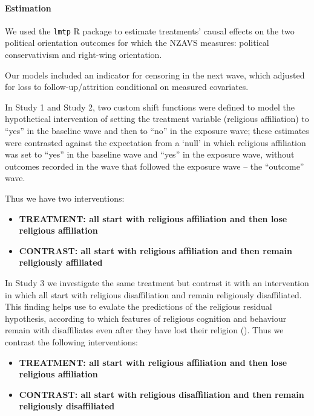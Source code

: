 \documentclass[
  singlecolumn]{article}
\let\oldparagraph\paragraph
\renewcommand{\paragraph}[1]{\oldparagraph{#1}\mbox{}}
\begin{document}
\paragraph{Estimation}\label{estimation}

We used the \texttt{lmtp} R package to estimate treatments' causal
effects on the two political orientation outcomes for which the NZAVS
measures: political conservativism and right-wing orientation.

Our models included an indicator for censoring in the next wave, which
adjusted for loss to follow-up/attrition conditional on measured
covariates.

In Study 1 and Study 2, two custom shift functions were defined to model
the hypothetical intervention of setting the treatment variable
(religious affiliation) to ``yes'' in the baseline wave and then to
``no'' in the exposure wave; these estimates were contrasted against the
expectation from a `null' in which religious affiliation was set to
``yes'' in the baseline wave and ``yes'' in the exposure wave, without
outcomes recorded in the wave that followed the exposure wave -- the
``outcome'' wave.

Thus we have two interventions:

\begin{itemize}
\item
  \textbf{TREATMENT: all start with religious affiliation and then lose
  religious affiliation}
\item
  \textbf{CONTRAST: all start with religious affiliation and then remain
  religiously affiliated}
\end{itemize}

In Study 3 we investigate the same treatment but contrast it with an
intervention in which all start with religious disaffiliation and remain
religiously disaffiliated. This finding helps use to evalate the
predictions of the religious residual hypothesis, according to which
features of religious cognition and behaviour remain with disaffiliates
even after they have lost their religion
(). Thus
we contrast the following interventions:

\begin{itemize}
\item
  \textbf{TREATMENT: all start with religious affiliation and then lose
  religious affiliation}
\item
  \textbf{CONTRAST: all start with religious disaffiliation and then
  remain religiously disaffiliated}
\end{itemize}
\end{document}
